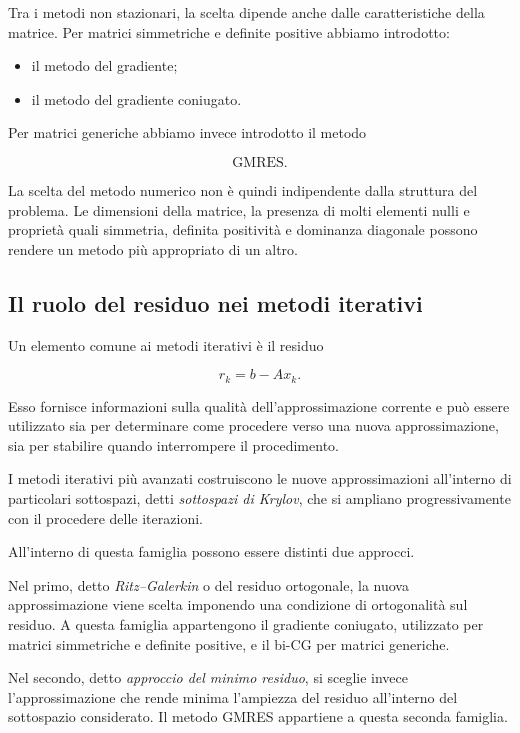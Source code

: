 Tra i metodi non stazionari, la scelta dipende anche dalle
caratteristiche della matrice. Per matrici simmetriche e definite
positive abbiamo introdotto:

\begin{itemize}
    \item il metodo del gradiente;
    \item il metodo del gradiente coniugato.
\end{itemize}

Per matrici generiche abbiamo invece introdotto il metodo

\begin{equation*}
    \text{GMRES}.
\end{equation*}

La scelta del metodo numerico non è quindi indipendente dalla
struttura del problema. Le dimensioni della matrice, la presenza
di molti elementi nulli e proprietà quali simmetria, definita
positività e dominanza diagonale possono rendere un metodo più
appropriato di un altro.


\subsection{Il ruolo del residuo nei metodi iterativi}

Un elemento comune ai metodi iterativi è il residuo

\begin{equation*}
    r_k=b-Ax_k.
\end{equation*}

Esso fornisce informazioni sulla qualità dell'approssimazione
corrente e può essere utilizzato sia per determinare come
procedere verso una nuova approssimazione, sia per stabilire
quando interrompere il procedimento.

I metodi iterativi più avanzati costruiscono le nuove
approssimazioni all'interno di particolari sottospazi, detti
\emph{sottospazi di Krylov}, che si ampliano progressivamente
con il procedere delle iterazioni.

All'interno di questa famiglia possono essere distinti due
approcci.

Nel primo, detto \emph{Ritz--Galerkin} o del residuo ortogonale,
la nuova approssimazione viene scelta imponendo una condizione
di ortogonalità sul residuo. A questa famiglia appartengono il
gradiente coniugato, utilizzato per matrici simmetriche e definite
positive, e il bi-CG per matrici generiche.

Nel secondo, detto \emph{approccio del minimo residuo}, si sceglie
invece l'approssimazione che rende minima l'ampiezza del residuo
all'interno del sottospazio considerato. Il metodo GMRES appartiene
a questa seconda famiglia.

